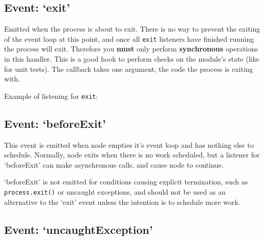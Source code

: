 \subsection{\texorpdfstring{Event:
`exit'}{Event: exit}}\label{event-exit}

Emitted when the process is about to exit. There is no way to prevent
the exiting of the event loop at this point, and once all \texttt{exit}
listeners have finished running the process will exit. Therefore you
\textbf{must} only perform \textbf{synchronous} operations in this
handler. This is a good hook to perform checks on the module's state
(like for unit tests). The callback takes one argument, the code the
process is exiting with.

Example of listening for \texttt{exit}:

\begin{Shaded}
\begin{Highlighting}[]
\NormalTok{(}\NormalTok{, }
  \NormalTok{(}\NormalTok{() \{}
    \NormalTok{(}\NormalTok{);}
  \NormalTok{\}, }\NormalTok{);}
  \NormalTok{(}
\NormalTok{\});}
\end{Highlighting}
\end{Shaded}

\subsection{\texorpdfstring{Event:
`beforeExit'}{Event: beforeExit}}\label{event-beforeexit}

This event is emitted when node empties it's event loop and has nothing
else to schedule. Normally, node exits when there is no work scheduled,
but a listener for `beforeExit' can make asynchronous calls, and cause
node to continue.

`beforeExit' is not emitted for conditions causing explicit termination,
such as \texttt{process.exit()} or uncaught exceptions, and should not
be used as an alternative to the `exit' event unless the intention is to
schedule more work.

\subsection{\texorpdfstring{Event:
`uncaughtException'}{Event: uncaughtException}}\label{event-uncaughtexception}

